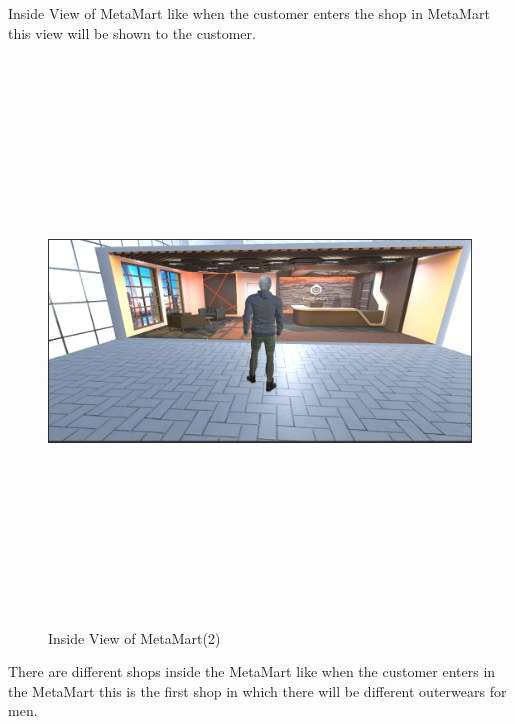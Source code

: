   Inside View of MetaMart like when the customer enters the shop in MetaMart this view will be shown to the customer.
\begin{figure}[H]
    \centering
    \includegraphics[width=15cm,height=15cm]{Figures/Environment/insidevie2.png}
    \caption{Inside View of MetaMart(2)}
    \label{fig: Entrance of MetaMart}
\end{figure}
\justifying
  There are different shops inside the MetaMart like when the customer enters in the MetaMart this is the first shop in which there will be different outerwears for men.
